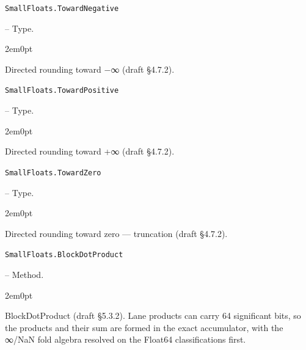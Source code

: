 \par\medskip\noindent\begin{minipage}{\linewidth}
\hypertarget{11984278085027763854}{\texttt{SmallFloats.TowardNegative}}  -- {Type.}
\nopagebreak
\begin{adjustwidth}{2em}{0pt}

Directed rounding toward −∞ (draft §4.7.2).



\end{adjustwidth}
\end{minipage}
\par\medskip

\par\medskip\noindent\begin{minipage}{\linewidth}
\hypertarget{14592637289702736603}{\texttt{SmallFloats.TowardPositive}}  -- {Type.}
\nopagebreak
\begin{adjustwidth}{2em}{0pt}

Directed rounding toward +∞ (draft §4.7.2).



\end{adjustwidth}
\end{minipage}
\par\medskip

\par\medskip\noindent\begin{minipage}{\linewidth}
\hypertarget{14300163576002667725}{\texttt{SmallFloats.TowardZero}}  -- {Type.}
\nopagebreak
\begin{adjustwidth}{2em}{0pt}

Directed rounding toward zero — truncation (draft §4.7.2).



\end{adjustwidth}
\end{minipage}
\par\medskip

\par\medskip\noindent\begin{minipage}{\linewidth}
\hypertarget{14325508049649243681}{\texttt{SmallFloats.BlockDotProduct}}  -- {Method.}
\nopagebreak
\begin{adjustwidth}{2em}{0pt}

BlockDotProduct (draft §5.3.2). Lane products can carry 64 significant bits, so the products and their sum are formed in the exact accumulator, with the ∞/NaN fold algebra resolved on the Float64 classifications first.



\end{adjustwidth}
\end{minipage}
\par\medskip

